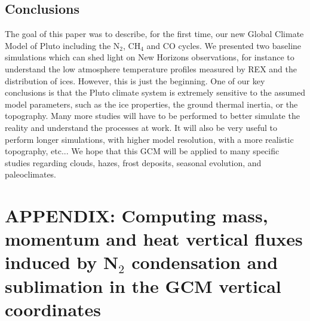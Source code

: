 
\subsection{Conclusions}

The goal of this paper was to describe, for the first time, our new Global Climate Model
of Pluto including the N$_2$, CH$_4$ and CO cycles. We presented two baseline
simulations which can shed light on New Horizons observations, for instance
to understand  the low
atmosphere temperature profiles measured by REX and the distribution of ices.
However, this is just the beginning. 
One of our key conclusions is that the Pluto climate system is extremely
sensitive to the assumed model parameters, such as the ice properties, the ground
thermal inertia, or the topography. Many more studies will have to be performed to
better simulate the reality and understand the processes at work. It
will also be very useful to perform longer simulations, with higher model resolution,
with a more realistic topography, etc...
We hope that this GCM will be applied to many specific studies
regarding clouds, hazes, frost deposits, seasonal evolution, and paleoclimates.  

\section*{APPENDIX: Computing mass, momentum and heat vertical fluxes induced by N$_2$
condensation and sublimation in the GCM vertical coordinates}

